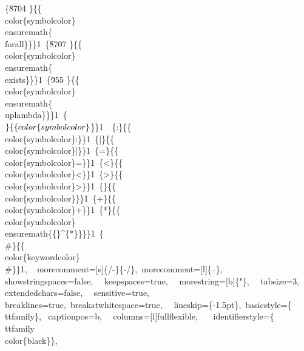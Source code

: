 {\{\u8704 \}\{\{\\color\{symbolcolor\}\\ensuremath\{\\forall\}\}\}1\
\{\u8707 \}\{\{\\color\{symbolcolor\}\\ensuremath\{\\exists\}\}\}1\
\{\u955 \}\{\{\\color\{symbolcolor\}\\ensuremath\{\\uplambda\}\}\}1\
\{\\$\}\{\{\\color\{symbolcolor\}\\$\}\}1\
\
\{:\}\{\{\\color\{symbolcolor\}:\}\}1\
\{|\}\{\{\\color\{symbolcolor\}|\}\}1\
\{=\}\{\{\\color\{symbolcolor\}=\}\}1\
\{<\}\{\{\\color\{symbolcolor\}<\}\}1\
\{>\}\{\{\\color\{symbolcolor\}>\}\}1\
\{<|>\}\{\{\\color\{symbolcolor\}<|>\}\}1\
\{+\}\{\{\\color\{symbolcolor\}+\}\}1\
\{*\}\{\{\\color\{symbolcolor\}\\ensuremath\{\{\}^\{*\}\}\}\}1\
\{\\#\}\{\{\\color\{keywordcolor\}\\#\}\}1, %
\
morecomment=[s]\{/-\}\{-/\},\
morecomment=[l]\{--\},\
\
showstringspaces=false,\
\
keepspaces=true,\
\
morestring=[b]\{"\},\
\
tabsize=3,\
\
extendedchars=false,\
\
sensitive=true,\
\
breaklines=true,\
breakatwhitespace=true,\
\
lineskip=\{-1.5pt\},\
basicstyle=\{\\ttfamily\},\
captionpos=b,\
\
columns=[l]fullflexible,\
\
\
identifierstyle=\{\\ttfamily\\color\{black\}\},\
}

